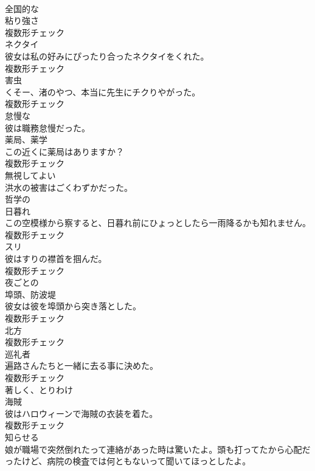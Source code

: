\documentclass[8pt]{extreport}
\begin{document}
\begin{CJK}{UTF8}{min}
\\	[形容詞]	全国的な	
\\	[名詞]	粘り強さ	
\\	複数形チェック
\\	[名詞]	ネクタイ	
\\	彼女は私の好みにぴったり合ったネクタイをくれた。	
\\	複数形チェック
\\	[名詞]	害虫	
\\	くそー、渚のやつ、本当に先生にチクりやがった。	
\\	複数形チェック
\\	[形容詞]	怠慢な	
\\	彼は職務怠慢だった。	
\\	[名詞]	薬局、薬学	
\\	この近くに薬局はありますか？	
\\	複数形チェック
\\	[形容詞]	無視してよい	
\\	洪水の被害はごくわずかだった。	
\\	[形容詞]	哲学の	
\\	[名詞]	日暮れ	
\\	この空模様から察すると、日暮れ前にひょっとしたら一雨降るかも知れません。	
\\	複数形チェック
\\	[名詞]	スリ	
\\	彼はすりの襟首を掴んだ。	
\\	複数形チェック
\\	[形容詞]	夜ごとの	
\\	[名詞]	埠頭、防波堤	
\\	彼女は彼を埠頭から突き落とした。	
\\	複数形チェック
\\	[名詞]	北方	
\\	複数形チェック
\\	[名詞]	巡礼者	
\\	遍路さんたちと一緒に去る事に決めた。	
\\	複数形チェック
\\	[副詞]	著しく、とりわけ	
\\	[名詞]	海賊	
\\	彼はハロウィーンで海賊の衣装を着た。	
\\	複数形チェック
\\	[動詞]	知らせる	
\\	娘が職場で突然倒れたって連絡があった時は驚いたよ。頭も打ってたから心配だったけど、病院の検査では何ともないって聞いてほっとしたよ。	

\end{CJK}
\end{document}
